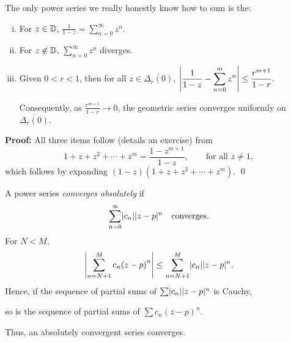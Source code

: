 \documentclass[10pt,aspectratio=169]{beamer}
\begin{document}
\begin{frame}
The only power series we really honestly know how to sum is the:

\begin{proposition}
\pause
\begin{enumerate}[(i)]
\item For $z \in {\mathbb{D}}$,
\quad
$\displaystyle
\frac{1}{1-z} = \sum_{n=0}^\infty z^n .
$
\pause
\item For $z \not\in {\mathbb{D}}$,
\quad
$\displaystyle
\sum_{n=0}^\infty z^n
$
diverges.
\pause
\item
Given $0 < r < 1$, then for all $z \in \overline{\Delta_r(0)}$,
\quad
$\displaystyle
\left\lvert {\frac{1}{1-z} - \sum_{n=0}^m z^n} \right\rvert
\leq \frac{r^{m+1}}{1-r} .
$
\pause

Consequently,
as $\frac{r^{m+1}}{1-r} \to 0$,
the geometric series converges uniformly
on $\overline{\Delta_r(0)}$.
\end{enumerate}
\end{proposition}

\pause
\textbf{Proof:}
All three items follow (details an exercise) from
\[
1+z+z^2+\cdots+z^m = \frac{1-z^{m+1}}{1-z} ,
\qquad \text{for all } z \not= 1,
\]
\pause
which follows by expanding $(1-z)(1+z+z^2+\cdots+z^m)$.
\qed
\end{frame}

\begin{frame}
A power series \emph{converges absolutely} if
\[
\sum_{n=0}^\infty \lvert {c_n} \rvert \lvert {z-p} \rvert^n \quad \text{converges.}
\]
\pause
For $N < M$,
\[
\left\lvert {\sum_{n=N+1}^M c_n {(z-p)}^n} \right\rvert
\leq
\sum_{n=N+1}^M \lvert {c_n} \rvert \lvert {z-p} \rvert^n .
\]
\pause
Hence,
if the sequence of partial sums of 
$\sum \lvert {c_n} \rvert \lvert {z-p} \rvert^n$ is Cauchy,

so is the sequence
of partial sums of $\sum c_n {(z-p)}^n$.

\medskip
\pause
Thus, an absolutely convergent series converges.
\end{frame}
\end{document}

